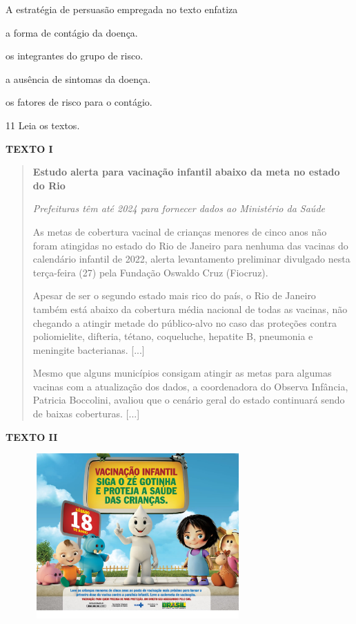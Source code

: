 A estratégia de persuasão empregada no texto enfatiza

\begin{escolha}
\item
  a forma de contágio da doença.
\item
  os integrantes do grupo de risco.
\item
  a ausência de sintomas da doença.
\item
  os fatores de risco para o contágio.
\end{escolha}

\num{11} Leia os textos.

\textbf{TEXTO I}

\begin{quote}
\centering\textbf{Estudo alerta para vacinação infantil abaixo da meta no estado
do Rio}

\emph{Prefeituras têm até 2024 para fornecer dados ao Ministério da
Saúde}

As metas de cobertura vacinal de crianças menores de cinco anos não
foram atingidas no estado do Rio de Janeiro para nenhuma das vacinas do
calendário infantil de 2022, alerta levantamento preliminar divulgado
nesta terça-feira (27) pela Fundação Oswaldo Cruz (Fiocruz).

Apesar de ser o segundo estado mais rico do país, o Rio de Janeiro
também está abaixo da cobertura média nacional de todas as vacinas, não
chegando a atingir metade do público-alvo no caso das proteções contra
poliomielite, difteria, tétano, coqueluche, hepatite B, pneumonia e
meningite bacterianas. {[}...{]}

Mesmo que alguns municípios consigam atingir as metas para algumas
vacinas com a atualização dos dados, a coordenadora do Observa Infância,
Patricia Boccolini, avaliou que o cenário geral do estado continuará
sendo de baixas coberturas. {[}...{]}

\end{quote}


\textbf{TEXTO II}

\begin{figure}[H]
\centering
\includegraphics[width=3.15625in,height=2.48418in]{./imgSAEB_8_POR/media/image32.png}
\end{figure}


